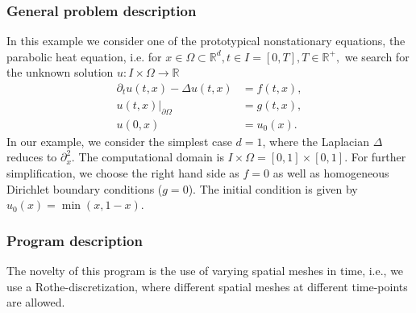 \subsubsection{General problem description}

In this example we consider one of the prototypical nonstationary equations, the parabolic heat equation, i.e. for $x \in \Omega \subset \mathbb{R}^d, t\in I =[0,T], T\in \mathbb{R}^+,$ we search for the unknown solution $u:I \times \Omega \rightarrow \mathbb{R}$
\begin{align*}
\partial_t u(t,x) - \Delta u(t,x) &= f(t,x),\\
u(t,x)|_{\partial \Omega} &= g(t,x),\\
u(0,x) &= u_0(x).
\end{align*} In our example, we consider the simplest case $d=1$, where the Laplacian $\Delta$ reduces to $\partial_x^2$. The computational domain is $ I\times \Omega = [0,1] \times [0,1]$. For further simplification, we choose the right hand side as $f=0$ as well as homogeneous Dirichlet boundary conditions ($g=0$). The initial condition is given by $u_0(x) = \min(x,1-x)$.

\subsubsection{Program description}
The novelty of this program is the use of varying spatial meshes in
time, i.e., we use a  Rothe-discretization,
where different spatial meshes at different time-points are allowed.

